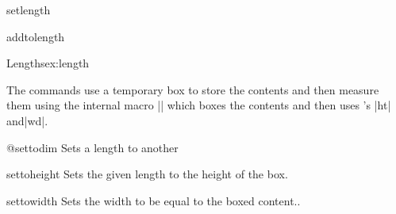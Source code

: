 \begin{teXXX}
\def\newlength#1{\@ifdefinable#1{\newskip#1}}
\end{teXXX}

\begin{docCommand}{setlength} {}
\end{docCommand}
\begin{teXXX}
\def\setlength#1#2{#1#2\relax}
\end{teXXX}

\begin{docCommand}{addtolength} {}
\end{docCommand}

\begin{teXXX}
\def\addtolength#1#2{\advance#1 #2\relax}
\end{teXXX}


\begin{texexample}{Lengths}{ex:length}
\bgroup
\newlength\alength
\setlength\alength{123.12pt}
\the\alength

\addtolength\alength{12.0pt}
\the\alength
\egroup
\end{texexample}

The  commands use a temporary box  to store the contents and then 
measure them using the internal macro |\@settodim| which boxes the contents and then uses \tex's |ht| and|wd|.

\begin{docCommand}{@settodim}{\marg{}\marg{}\marg{}}
Sets a length to another
\end{docCommand}

\begin{teXXX}
\def\@settodim#1#2#3{\setbox\@tempboxa\hbox{{#3}}#2#1\@tempboxa
  \setbox\@tempboxa\box\voidb@x}
  \def\settodepth {\@settodim\dp}
\end{teXXX}

\begin{docCommand}{settoheight}{}
Sets the given length to the height of the box.
\end{docCommand}

\begin{teXXX}
\def\settoheight{\@settodim\ht}
\end{teXXX}

\begin{docCommand}{settowidth}{ }
Sets the width to be equal to the boxed content..
\end{docCommand}
\begin{teXXX}  
  \def\settowidth {\@settodim\wd}
\end{teXXX}



